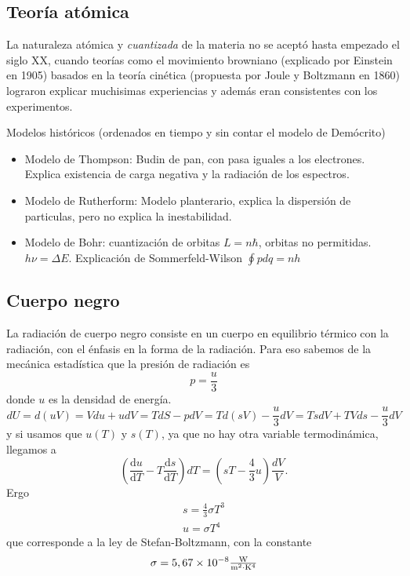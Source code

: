 \documentclass{book}
\numberwithin{equation}{section} %
\begin{document}
\subsection{Teoría atómica}
La naturaleza atómica y \emph{cuantizada} de la materia no se aceptó hasta empezado el siglo XX, cuando teorías como el movimiento browniano (explicado por Einstein en 1905) basados en la teoría cinética (propuesta por Joule y Boltzmann en 1860) lograron explicar muchisimas experiencias y además eran consistentes con los experimentos.

Modelos históricos (ordenados en tiempo y sin contar el modelo de Demócrito)
\begin{itemize}
\item Modelo de Thompson: Budin de pan, con pasa iguales a los electrones. Explica existencia de carga negativa y la radiación de los espectros.
\item Modelo de Rutherform: Modelo planterario, explica la dispersión de particulas, pero no explica la inestabilidad.
\item Modelo de Bohr: cuantización de orbitas $L = n\hbar$, orbitas no permitidas. $h \nu = \Delta E$. Explicación de Sommerfeld-Wilson $\displaystyle \oint p dq = n h$
\end{itemize}

\subsection{Cuerpo negro}
La radiación de cuerpo negro consiste en un cuerpo en equilibrio térmico con la radiación, con el énfasis en la forma de la radiación.
Para eso sabemos de la mecánica estadística que la presión de radiación es
\[ p = \frac{u}{3} \]
donde $u$ es la densidad de energía. 
\[dU = d(u V) = V du + u dV = T dS - p dV = T d(s V) - \frac{u}{3} dV = T s dV + T V ds - \frac{u}{3} dV\]
y si usamos que $u(T)$ y $s(T)$, ya que no hay otra variable termodinámica, llegamos a
\[ \left( \frac{\mathrm{d} u}{\mathrm{d} T} - T \frac{\mathrm{d} s}{\mathrm{d} T} \right) dT = \left(s T - \frac{4}{3} u \right) \frac{dV}{V}.\]
Ergo
\begin{equation}
\begin{gathered}
 s = \frac{4}{3} \sigma T^3\\
 u = \sigma T^4
\end{gathered}
\end{equation}
que corresponde a la ley de Stefan-Boltzmann, con la constante 
\begin{equation}
\sigma = 5,67\times 10^{-8} \rm\textstyle \frac{W}{m^2 \cdot K^4} 
\end{equation}
\end{document}
